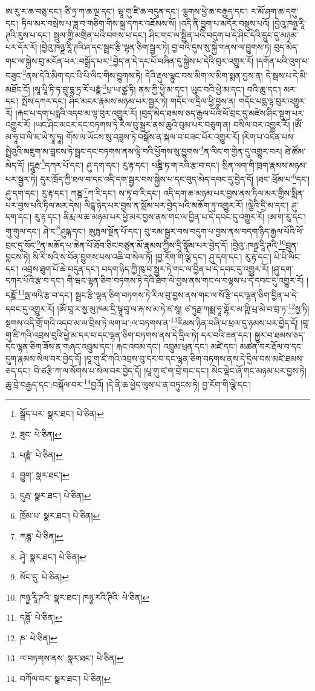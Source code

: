 ཨ་རུ་ར་ཆ་བཅུ་དང་། ཙི་ཏྲ་ཀ་ཆ་ལྔ་དང་། ཝཱ་གུ་ཛི་ཆ་བདུན་དང་། ལྕགས་ཕྱེ་ཆ་བརྒྱད་དང་། ར་མོ་ཤག་ཆ་དགུ་དང་། ཏིལ་མར་བསྲེས་པ་ཟླ་བ་གཅིག་གིས་སྐྲ་དཀར་འཇོམས་སོ། །འདི་ནི་བྱུག་པ་མདོར་བསྡུས་པའོ། །བྱེའུ་ཁཉྫ་རཱི་ཊའི་རུས་པ་དང་། སྦྲུལ་གྱི་མགྲིན་པའི་བགས་པ་དང་། ཤིང་གང་ལ་སྦྱིན་པའི་བདུག་པ་དེ་ཤིང་དེའི་དྲུང་དུ་མཉམ་པར་དོར་རོ། །བྱེའུ་ཁཉྫ་རཱི་ཊའི་ཤ་དང་སྦྲང་རྩི་ལྷན་ཅིག་སྦྱར་ཏེ། བྱ་བའི་དུས་སུ་སྐྱེ་གནས་ལ་བྱུགས་ཏེ། བུད་མེད་གང་ལ་སྐྱེས་བུ་མངོན་པར་:བསྒྲོད་པར་\footnote{སྒྲོད་པར་  སྣར་ཐང་།  པེ་ཅིན། }བྱེད་ན་དེ་དང་པོ་བཞིན་དུ་སྐྱེས་པ་དེའི་བུར་འགྱུར་རོ། །དགོན་པའི་འུག་པ་བཟུང་\footnote{ཟུང་  པེ་ཅིན། }ནས་དེའི་མིག་དང་པི་པི་ལིང་གིས་བྱུགས་ཏེ། དེའི་རྡུལ་ལྷུང་བས་མིག་ལ་མིག་སྨན་བྱས་ན། དེ་སྦས་པ་དེ་མི་མཐོང་ངོ། །སཱ་པཱི་ཏི་ཏ་བྱཱ་དྷ་ཏྲ་རོ་པཎྣཾ་\footnote{པཎཱཾ་  པེ་ཅིན། }པྲ་ཡ་ཙྪ་ཏི། ནས་ཀྱི་ཕྱེ་མ་དང་། ཡུང་བའི་ཕྱེ་མ་དང་། བའི་ཆུ་དང་། མར་དང་། སྤོས་དཀར་དང་། ཤིང་མངར་རྣམས་མཉམ་པར་སྦྱར་ཏེ། གདོང་ལ་དྲིལ་ཕྱི་བྱས་ན། གདོང་པདྨ་ལྟ་བུར་འགྱུར་རོ། །རྐང་པ་དག་པདྨའི་འདབ་མ་ལྟ་བུར་འགྱུར་རོ། །བུད་མེད་ཐམས་ཅད་རྒྱལ་པོའི་ཕོ་བྲང་དུ་མཛེས་ཤིང་སྡུག་པར་འགྱུར་རོ། །ཡང་ཤིང་མངར་དང་བཏགས་ཏེ་རིལ་བུ་སྦྱར་ནས་ཆུའི་བུམ་པར་བཅུག་ན། བསིལ་བར་འགྱུར་རོ། །ཨོཾ་མ་ཧཱ་བ་ལི་ཇ་ཡེ་སྭཱ་ཧཱ། གོས་ལ་ཡོངས་སུ་བཟླས་ཏེ་བསྒོས་ན་སྐལ་བ་བཟང་པོར་འགྱུར་རོ། །རིག་པ་འཛིན་པས་སྤྲེའུའི་མཇུག་མ་བླངས་ཏེ་སྦྲང་དང་བཏགས་ནས་ལྟེ་བའི་ཕྱོགས་སུ་བྱུགས་\footnote{བྱུག་  སྣར་ཐང་། }ན་ལིང་ག་གྱེན་དུ་འགྱུར་བར། ཐེ་ཚོམ་མེད་དོ། །དཱུརྦ་\footnote{དུརྦ་  སྣར་ཐང་།  པེ་ཅིན། }དཀར་པོ་དང་། ཤུ་དག་དང་། རུ་རྟ་དང་། པཎྜི་ཏ་ག་རའི་རྩ་བ་དང་། སྲིན་ལག་གི་ཁྲག་རྣམས་མཉམ་པར་སྦྱར་ཏེ། དུར་ཁྲོད་ཀྱི་ཐལ་བ་དང་འདི་དག་སྦྱར་བས་སྐྱེས་པ་དང་བུད་མེད་དབང་དུ་བྱེད་དོ། །ཐང་:ཕྲོམ་པ་\footnote{ཁྲོམ་པ་  སྣར་ཐང་།  པེ་ཅིན། }དང་། ཤུ་དག་དང་། རུ་རྟ་དང་། ཀཎྜ་\footnote{ཀཎྚ་  པེ་ཅིན། }ཀ་རི་དང་། ས་ཏཱ་བ་རི་དང་། འདི་དག་ཆ་མཉམ་པར་བྱས་ནས་ཏིལ་མར་གྱིས་སྨིན་པར་བྱས་པའི་ཏིལ་མར་དེས། ལིངྒ་ཉེད་པར་བྱས་ན་སྦོམ་པར་བྱེད་པའི་མཆོག་ཏུ་འགྱུར་རོ། །ལྕེའི་དྲི་མ་དང་། ཤུ་དག་དང་། རུ་རྟ་དང་། ནིརྨ་ལ་ཆ་མཉམ་པར་ཕྱེ་མར་བྱས་ནས་གང་ལ་བྱིན་པ་དེ་དབང་དུ་འགྱུར་རོ། །ཨ་ག་རུ་དང་། གུ་གུལ་དང་། ཤེ་ང་\footnote{ཤྭེ་  སྣར་ཐང་།  པེ་ཅིན། }ཤུཥྐ་དང་། ཨུཏྤལ་སྔོན་པོ་དང་། བུ་རམ་སྦྱར་བས་བདུག་པ་བྱས་ནས་བདག་ཉིད་རྒྱལ་པོའི་ཕོ་བྲང་དུ་སོང་\footnote{སོང་དུ་  པེ་ཅིན། }ན་མཆོད་པ་ཆེན་པོ་ཐོབ་ཅིང་བཙུན་མོ་རྣམས་ཀྱིས་དྲི་སྣོམ་པར་བྱེད་དོ། །བྱེའུ་:ཁཉྫ་རཱི་ཊའི་\footnote{ཁཉྫ་རཱི་ཌའི་  སྣར་ཐང་། ཁཉྩ་རའི་ཊིའི་  པེ་ཅིན། }བྲུན་བླངས་ཏེ། སི་རི་སའི་ས་བོན་བྱུགས་པས་འཆི་བ་སེལ་ཏོ། །བྱ་རོག་གི་ལྕེ་དང་། ཤུ་དག་དང་། རུ་རྟ་དང་། པི་པི་ལིང་དང་། འབྲས་ཐུག་པོ་ཆེ་བདུན་དང་། བདག་ཉིད་ཀྱི་ཁུ་བ་སྦྱར་ཏེ་གང་ལ་བྱིན་པ་དེ་དབང་དུ་འགྱུར་རོ། །ཤུ་དག་དཀར་པོའི་རྩ་བ་དང་། གི་ཝང་ལྷན་ཅིག་བཏགས་ཏེ་དེའི་ཐིག་ལེ་བྱས་ནས་གང་ལ་བལྟས་པ་དེ་དབང་དུ་འགྱུར་རོ། །དཎྜོ་\footnote{དཎྚོ་  པེ་ཅིན། }ཏྤ་ལའི་རྩ་བ་དང་། སྦྲང་རྩི་ལྷན་ཅིག་བཏགས་ཏེ་རིལ་བུ་བྱས་ནས་གང་ལ་སོ་རྩི་དང་ལྷན་ཅིག་བྱིན་པ་དེ་དབང་དུ་འགྱུར་རོ། །ཨོཾ་བཱ་ར་སྱ་མུ་ཁམ་དྲི་ཥྚཱ་བཱ་ལ་རྐ་ས་མ་ཏེ་ཛ་སཱ། ཙ་ཏུརྠ་ཀམྨ་ཧཱ་གྷོར་མ་ཀྵི་པྲ་མེ་བ་བྲ་ཏ་\footnote{ཎ་  པེ་ཅིན། }སྱ་ཏི། སྔགས་འདི་གྲོ་གའི་འདབ་མ་ལ་བྲིས་ཏེ་ལག་པ་:ལ་བཏགས་ན་\footnote{ལ་བཏགས་ནས་  སྣར་ཐང་།  པེ་ཅིན། }རིམས་ཉིན་བཞི་པ་ཕྲལ་དུ་ཉམས་པར་བྱེད་དོ། །བཱ་གུ་ཛི་ཀའི་འབྲས་བུའི་ཕྱེ་མ་དར་བ་དང་ལྷན་ཅིག་བཏགས་ནས་དེ་དྲིལ་ཏེ། དར་བའི་ཟན་དང་། སྐྱུར་བ་ཐམས་ཅད་དང་ལྷན་ཅིག་ཟོས་ན་གཞང་འབྲུམ་དང་། རྐང་འབམ་དང་། འབྲུམ་ཕྲན་དང་། མཛེ་དང་། མཚན་བར་རྡོལ་བ་དང་དུག་རྣམས་སེལ་བར་བྱེད་དོ། །བཱ་གུ་ཛི་ཀའི་འབྲས་བུ་དར་བ་དང་ལྷན་ཅིག་བཏགས་ནས་དེ་དྲིལ་བས་མཛེ་ཐམས་ཅད་དང་། བི་ཙརྩི་ཀ་ལ་སོགས་པ་སེལ་བར་བྱེད་དོ། །པཱ་གུ་ཛ་ག་བྲེ་གང་དང་། སེང་ལྡེང་ཞོ་གང་མཉམ་པར་བྱས་ཏེ། ཆུ་བྲེ་བརྒྱད་དང་:བསྐོལ་བར་\footnote{བཀོལ་བར་  སྣར་ཐང་།  པེ་ཅིན། }བྱའོ། །དེ་ནི་ཆ་ཕྱེད་ལུས་པ་ན་བཏུངས་ཏེ། བྱ་རོག་གི་ལྕེ་དང་། 